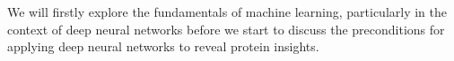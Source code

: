We will firstly explore the fundamentals of machine learning, particularly in the context of deep neural networks before we start to discuss the preconditions for applying deep neural networks to reveal protein insights. 
